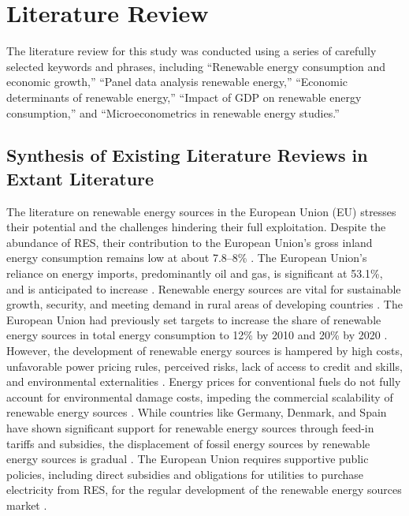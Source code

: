\documentclass[a4paper,11pt]{article}
\begin{document}
\section{Literature Review}
The literature review for this study was conducted using a series of carefully selected keywords and phrases, including ``Renewable energy consumption and economic growth,'' ``Panel data analysis renewable energy,'' ``Economic determinants of renewable energy,'' ``Impact of GDP on renewable energy consumption,'' and ``Microeconometrics in renewable energy studies.''

\subsection{Synthesis of Existing Literature Reviews in Extant Literature}
The literature on renewable energy sources in the European Union (EU) stresses their potential and the challenges hindering their full exploitation. Despite the abundance of RES, their contribution to the European Union's gross inland energy consumption remains low at about 7.8--8\% \parencite{ref18,ref26}. The European Union's reliance on energy imports, predominantly oil and gas, is significant at 53.1\%, and is anticipated to increase \parencite{ref18,ref26}. Renewable energy sources are vital for sustainable growth, security, and meeting demand in rural areas of developing countries \parencite{ref26}. The European Union had previously set targets to increase the share of renewable energy sources in total energy consumption to 12\% by 2010 and 20\% by 2020 \parencite{ref37,ref52}. However, the development of renewable energy sources is hampered by high costs, unfavorable power pricing rules, perceived risks, lack of access to credit and skills, and environmental externalities \parencite{ref14,ref26}. Energy prices for conventional fuels do not fully account for environmental damage costs, impeding the commercial scalability of renewable energy sources \parencite{ref14}. While countries like Germany, Denmark, and Spain have shown significant support for renewable energy sources through feed-in tariffs and subsidies, the displacement of fossil energy sources by renewable energy sources is gradual \parencite{ref39,ref26}. The European Union requires supportive public policies, including direct subsidies and obligations for utilities to purchase electricity from RES, for the regular development of the renewable energy sources market \parencite{ref26}.
\end{document}

